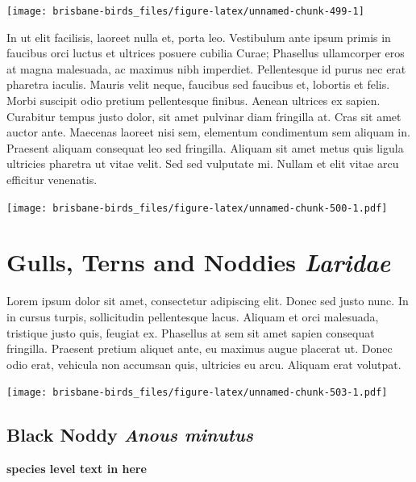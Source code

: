 \documentclass[]{book}
\let\origfigure\figure
\let\endorigfigure\endfigure
\renewenvironment{figure}[1][2] {
  \expandafter\origfigure\expandafter[H]
} {
  \endorigfigure
}
\begin{document}
\begin{figure}
\texttt{[image: brisbane-birds\_files/figure-latex/unnamed-chunk-499-1]} \caption{insert figure caption}\label{fig:unnamed-chunk-499}
\end{figure}

In ut elit facilisis, laoreet nulla et, porta leo. Vestibulum ante ipsum
primis in faucibus orci luctus et ultrices posuere cubilia Curae;
Phasellus ullamcorper eros at magna malesuada, ac maximus nibh
imperdiet. Pellentesque id purus nec erat pharetra iaculis. Mauris velit
neque, faucibus sed faucibus et, lobortis et felis. Morbi suscipit odio
pretium pellentesque finibus. Aenean ultrices ex sapien. Curabitur
tempus justo dolor, sit amet pulvinar diam fringilla at. Cras sit amet
auctor ante. Maecenas laoreet nisi sem, elementum condimentum sem
aliquam in. Praesent aliquam consequat leo sed fringilla. Aliquam sit
amet metus quis ligula ultricies pharetra ut vitae velit. Sed sed
vulputate mi. Nullam et elit vitae arcu efficitur venenatis.

\begin{figure}
\centering
\texttt{[image: brisbane-birds\_files/figure-latex/unnamed-chunk-500-1.pdf]}
\caption{\label{fig:unnamed-chunk-500}insert figure caption}
\end{figure}

\chapter{\texorpdfstring{Gulls, Terns and Noddies
\emph{Laridae}}{Gulls, Terns and Noddies Laridae}}\label{gulls-terns-and-noddies-laridae}

Lorem ipsum dolor sit amet, consectetur adipiscing elit. Donec sed justo
nunc. In in cursus turpis, sollicitudin pellentesque lacus. Aliquam et
orci malesuada, tristique justo quis, feugiat ex. Phasellus at sem sit
amet sapien consequat fringilla. Praesent pretium aliquet ante, eu
maximus augue placerat ut. Donec odio erat, vehicula non accumsan quis,
ultricies eu arcu. Aliquam erat volutpat.

\texttt{[image: brisbane-birds\_files/figure-latex/unnamed-chunk-503-1.pdf]}

\section{\texorpdfstring{Black Noddy \emph{Anous
minutus}}{Black Noddy Anous minutus}}\label{black-noddy-anous-minutus}

\textbf{species level text in here}
\end{document}
